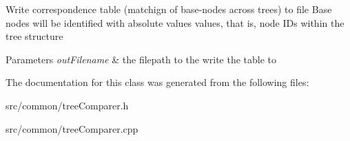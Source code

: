 \-Write correspondence table (matchign of base-\/nodes across trees) to file \-Base nodes will be identified with absolute values values, that is, node \-I\-Ds within the tree structure 
\begin{DoxyParams}{\-Parameters}
{\em out\-Filename} & the filepath to the write the table to \\
\hline
\end{DoxyParams}


\-The documentation for this class was generated from the following files\-:\begin{DoxyCompactItemize}
\item 
src/common/tree\-Comparer.\-h\item 
src/common/tree\-Comparer.\-cpp\end{DoxyCompactItemize}
